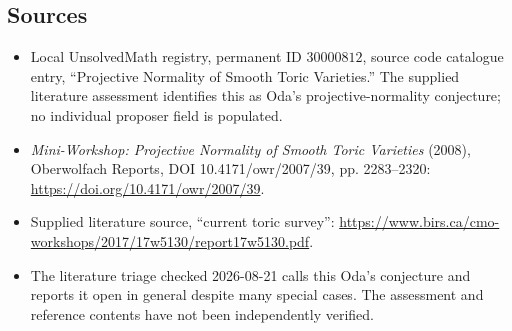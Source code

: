 \documentclass[11pt]{article}
\begin{document}
\subsection{Sources}
\begin{itemize}
\item Local UnsolvedMath registry, permanent ID \(30000812\), source code catalogue entry, ``Projective Normality of Smooth Toric Varieties.'' The supplied literature assessment identifies this as Oda's projective-normality conjecture; no individual proposer field is populated.
\item \emph{Mini-Workshop: Projective Normality of Smooth Toric Varieties} (2008), Oberwolfach Reports, DOI 10.4171/owr/2007/39, pp. 2283--2320: \url{https://doi.org/10.4171/owr/2007/39}.
\item Supplied literature source, ``current toric survey'': \url{https://www.birs.ca/cmo-workshops/2017/17w5130/report17w5130.pdf}.
\item The literature triage checked 2026-08-21 calls this Oda’s conjecture and reports it open in general despite many special cases. The assessment and reference contents have not been independently verified.
\end{itemize}
\end{document}
